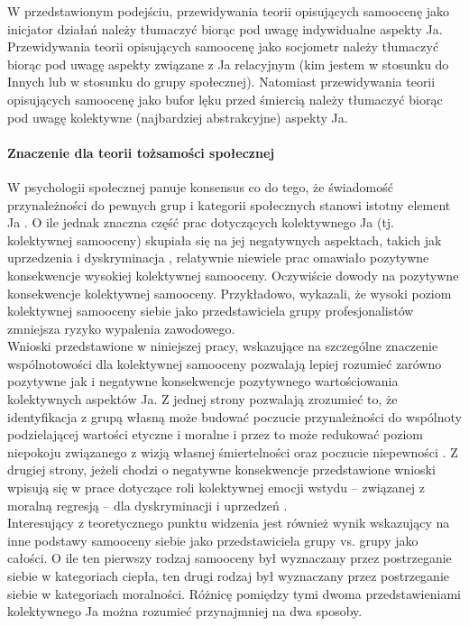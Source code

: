 \documentclass[man]{apa6}
\begin{document}
W przedstawionym podejściu, przewidywania teorii opisujących samoocenę jako inicjator działań należy tłumaczyć biorąc pod uwagę indywidualne aspekty Ja. Przewidywania teorii opisujących samoocenę jako socjometr należy tłumaczyć biorąc pod uwagę aspekty związane z Ja relacyjnym (kim jestem w stosunku do Innych lub w stosunku do grupy społecznej). Natomiast przewidywania teorii opisujących samoocenę jako bufor lęku przed śmiercią należy tłumaczyć biorąc pod uwagę kolektywne (najbardziej abstrakcyjne) aspekty Ja.\\

\paragraph{Znaczenie dla teorii tożsamości społecznej} W psychologii społecznej panuje konsensus co do tego, że świadomość przynależności do pewnych grup i kategorii społecznych stanowi istotny element Ja \parencite{ellemers2012group}. O ile jednak znaczna część prac dotyczących kolektywnego Ja (tj. kolektywnej samooceny) skupiała się na jej negatywnych aspektach, takich jak uprzedzenia i dyskryminacja \parencite[np.,][]{branscombe1994collective, crocker1990collective, jetten1997distinctiveness}, relatywnie niewiele prac omawiało pozytywne konsekwencje wysokiej kolektywnej samooceny. Oczywiście dowody na pozytywne konsekwencje kolektywnej samooceny. Przykładowo, \textcite{butler2005collective} wykazali, że wysoki poziom kolektywnej samooceny siebie jako przedstawiciela grupy profesjonalistów zmniejsza ryzyko wypalenia zawodowego.\\

Wnioski przedstawione w niniejszej pracy, wskazujące na szczególne znaczenie wspólnotowości dla kolektywnej samooceny pozwalają lepiej rozumieć zarówno pozytywne jak i negatywne konsekwencje pozytywnego wartościowania kolektywnych aspektów Ja. Z jednej strony pozwalają zrozumieć to, że identyfikacja z grupą własną może budować poczucie przynależności do wspólnoty podzielającej wartości etyczne i moralne i przez to może redukować poziom niepokoju związanego z wizją własnej śmiertelności \parencite{castano2004case} oraz poczucie niepewności \parencite{hogg2000subjective}. Z drugiej strony, jeżeli chodzi o negatywne konsekwencje przedstawione wnioski wpisują się w prace dotyczące roli kolektywnej emocji wstydu -- związanej z moralną regresją -- dla dyskryminacji i uprzedzeń \parencite[np.,][]{gausel2011concern}.\\

Interesujący z teoretycznego punktu widzenia jest również wynik wskazujący na inne podstawy samooceny siebie jako przedstawiciela grupy vs. grupy jako całości. O ile ten pierwszy rodzaj samooceny był wyznaczany przez postrzeganie siebie w kategoriach ciepła, ten drugi rodzaj był wyznaczany przez postrzeganie siebie w kategoriach moralności. Różnicę pomiędzy tymi dwoma przedstawieniami kolektywnego Ja można rozumieć przynajmniej na dwa sposoby.\\
\end{document}
